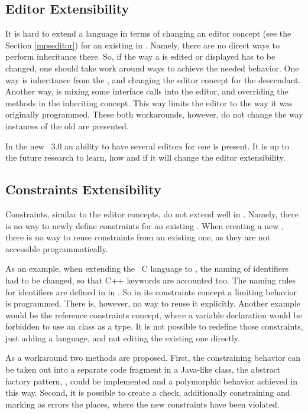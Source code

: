 \subsection{Editor Extensibility} 

It is hard to extend a language in terms of changing an editor concept (see the Section \ref{mpseditor}) for an existing  in \jbmps.
Namely, there are no direct ways to perform inheritance there. 
So, if the way a  is edited or displayed has to be 
changed, one should take work around ways to achieve the needed behavior. 
One way is inheritance from the , and changing the editor concept for the descendant.
Another way, is mixing some interface calls into the editor, and overriding the methods in the inheriting concept.
This way limits the editor to the way it was originally programmed.
These both workarounds, however, do not change the way instances of the old  are presented.

In the new \jbmps\ 3.0  an ability to have several editors for one  is present. It is 
up to the future research to learn, how and if it will change the editor extensibility.

\subsection{Constraints Extensibility}

Constraints, similar to the editor concepts, do not extend well in \jbmps. Namely, there is no way to newly define constraints
for an existing . When creating a new , there is no way to reuse constraints from an existing one, as they 
are not accessible programmatically.

As an example, when extending the \mbdr\ C language to \pcpp, the naming of identifiers had to be changed, so that C++ keywords
are accounted too. The naming rules for identifiers are defined in  in \mbdr.
So in its constraints concept a limiting behavior is programmed. There is, however, no way to reuse it explicitly.
Another example would be the reference constraints concept, where a variable declaration would be forbidden to use an  class
as a type. It is not possible to redefine those constraints, just adding a language, and not editing the existing one directly.

As a workaround two methods are proposed. First, the constraining behavior can be taken out into a separate code fragment in a Java-like class,
the abstract factory pattern, \cite{GOF95}, could be implemented and a polymorphic behavior achieved in this way.  Second, it is possible to 
create a check, additionally constraining and marking as errors the places, where the new constraints have been violated.

